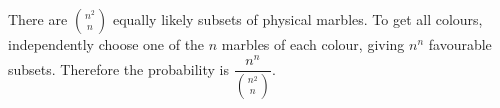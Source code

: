 There are $\binom{n^2}{n}$ equally likely subsets of physical marbles. To get all colours, independently choose one of the $n$ marbles of each colour, giving $n^n$ favourable subsets. Therefore the probability is $\boxed{\dfrac{n^n}{\binom{n^2}{n}}}$.
